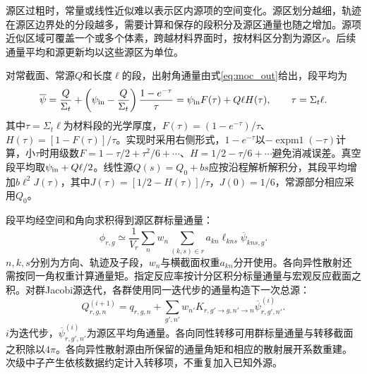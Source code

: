 \documentclass[UTF8, zihao=-4, fontset=none, a4paper]{ctexart}
\begin{document}
源区过粗时，常量或线性近似难以表示区内源项的空间变化。源区划分越细，轨迹在源区边界处的分段越多，需要计算和保存的段积分及源区通量也随之增加。源项近似区域可覆盖一个或多个体素，跨越材料界面时，按材料区分割为源区$r$。后续通量平均和源更新均以这些源区为单位。

对常截面、常源$Q$和长度$\ell$的段，出射角通量由式\eqref{eq:moc_out}给出，段平均为
\begin{equation}
\overline\psi=\frac{Q}{\Sigma_t}+
\left(\psi_{\rm in}-\frac{Q}{\Sigma_t}\right)\frac{1-e^{-\tau}}{\tau}
=\psi_{\rm in}F(\tau)+Q\ell H(\tau),\qquad \tau=\Sigma_t\ell.
\label{eq:segment}
\end{equation}
其中$\tau=\Sigma_t\ell$为材料段的光学厚度，$F(\tau)=(1-e^{-\tau})/\tau$、$H(\tau)=[1-F(\tau)]/\tau$。实现时采用右侧形式，$1-e^{-\tau}$以$-\operatorname{expm1}(-\tau)$计算，小$\tau$时用级数$F=1-\tau/2+\tau^2/6+\cdots$、$H=1/2-\tau/6+\cdots$避免消减误差。真空段平均取$\psi_{\rm in}+Q\ell/2$。线性源$Q(s)=Q_0+bs$应按沿程解析解积分，其段平均增加$b\ell^2J(\tau)$，其中$J(\tau)=[1/2-H(\tau)]/\tau$，$J(0)=1/6$，常源部分相应采用$Q_0$。

段平均经空间和角向求积得到源区群标量通量：
\begin{equation}
\phi_{r,g}\simeq\frac{1}{V_r}\sum_nw_n\sum_{(k,s)\in r}
 a_{kn}\ell_{kns}\overline\psi_{kns,g}.
\label{eq:tally}
\end{equation}
$n,k,s$分别为方向、轨迹及子段，$w_n$与横截面权重$a_{kn}$分开使用。各向异性散射还需按同一角权重计算通量矩。指定反应率按计分区积分标量通量与宏观反应截面之积。对群Jacobi源迭代，各群使用同一迭代步的通量构造下一次总源：
\begin{equation}
Q_{r,g,n}^{(i+1)}=q_{r,g,n}+
\sum_{g',n'}w_{n'}K_{r,g'\to g,n'\to n}\overline\psi_{r,g',n'}^{(i)}.
\label{eq:source}
\end{equation}
$i$为迭代步，$\overline\psi_{r,g',n'}^{(i)}$为源区平均角通量。各向同性转移可用群标量通量与转移截面之积除以$4\pi$。各向异性散射源由所保留的通量角矩和相应的散射展开系数重建。次级中子产生依核数据约定计入转移项，不重复加入已知外源。
\end{document}
